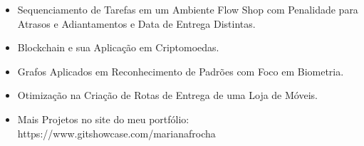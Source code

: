 \documentclass[10pt,a4paper,ragged2e]{altacv}
\begin{document}
\bigskip

\smallskip
\begin{itemize}
\item Sequenciamento de Tarefas em um Ambiente Flow Shop com Penalidade para Atrasos e Adiantamentos e Data de Entrega Distintas.
\smallskip
\item Blockchain e sua Aplicação em Criptomoedas.
\smallskip
\item Grafos Aplicados em Reconhecimento de Padrões com Foco em Biometria.
\smallskip
\item Otimização na Criação de Rotas de Entrega de uma Loja de Móveis.
\smallskip
\item Mais Projetos no site do meu portfólio: \newline https://www.gitshowcase.com/marianafrocha 
\smallskip
\end{itemize}
\bigskip






\end{document}
